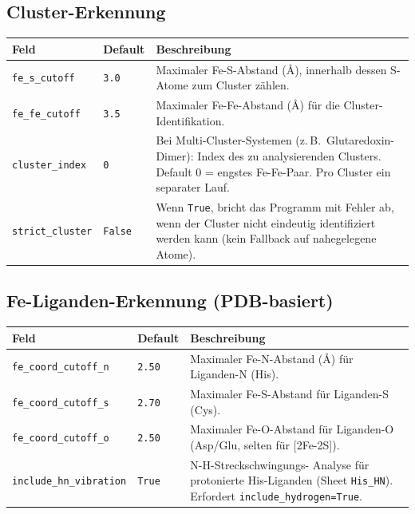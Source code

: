 \documentclass[11pt,a4paper,twoside]{article}
\theoremstyle{remark}
\begin{document}
\subsection{Cluster-Erkennung}

\begin{longtable}{p{} p{} p{}}
\toprule
\textbf{Feld} & \textbf{Default} & \textbf{Beschreibung} \\
\midrule
\endhead
\texttt{fe\_s\_cutoff}  & \texttt{3.0} & Maximaler Fe-S-Abstand (\AA{}),
  innerhalb dessen S-Atome zum Cluster z\"ahlen. \\
\texttt{fe\_fe\_cutoff} & \texttt{3.5} & Maximaler Fe-Fe-Abstand (\AA{})
  f\"ur die Cluster-Identifikation. \\
\texttt{cluster\_index} & \texttt{0}   & Bei Multi-Cluster-Systemen
  (z.\,B.\ Glutaredoxin-Dimer): Index des zu analysierenden Clusters.
  Default 0 = engstes Fe-Fe-Paar. Pro Cluster ein separater Lauf. \\
\texttt{strict\_cluster} & \texttt{False} & Wenn \texttt{True},
  bricht das Programm mit Fehler ab, wenn der Cluster nicht
  eindeutig identifiziert werden kann (kein Fallback auf nahegelegene
  Atome). \\
\bottomrule
\end{longtable}

\subsection{Fe-Liganden-Erkennung (PDB-basiert)}

\begin{longtable}{p{} p{} p{}}
\toprule
\textbf{Feld} & \textbf{Default} & \textbf{Beschreibung} \\
\midrule
\endhead
\texttt{fe\_coord\_cutoff\_n} & \texttt{2.50} & Maximaler Fe-N-Abstand
  (\AA{}) f\"ur Liganden-N (His). \\
\texttt{fe\_coord\_cutoff\_s} & \texttt{2.70} & Maximaler Fe-S-Abstand
  f\"ur Liganden-S (Cys). \\
\texttt{fe\_coord\_cutoff\_o} & \texttt{2.50} & Maximaler Fe-O-Abstand
  f\"ur Liganden-O (Asp/Glu, selten f\"ur {[}2Fe-2S{]}). \\
\texttt{include\_hn\_vibration} & \texttt{True} & N-H-Streckschwingungs-
  Analyse f\"ur protonierte His-Liganden (Sheet \texttt{His\_HN}).
  Erfordert \texttt{include\_hydrogen=True}. \\
\bottomrule
\end{longtable}
\end{document}
